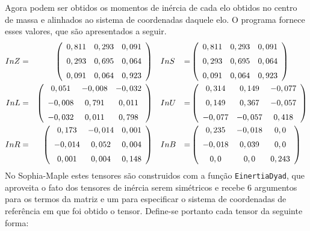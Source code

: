 Agora podem ser obtidos os momentos de inércia de cada elo obtidos no
centro de massa e alinhados ao sistema de coordenadas daquele elo. O programa
fornece esses valores, que são apresentados a seguir.
%
\begin{align*}
InZ &=& \left( \begin {array}{ccc}  0,811& 0,293& 0,091\\ \noalign{\medskip}
 0,293& 0,695& 0,064\\ \noalign{\medskip} 0,091& 0,064& 0,923
\end {array} \right) & \quad InS &=& \left( \begin {array}{ccc}  0,811& 0,293& 0,091\\ \noalign{\medskip}
 0,293& 0,695& 0,064\\ \noalign{\medskip} 0,091& 0,064& 0,923
\end {array} \right) \\
InL &=&  \left( \begin {array}{ccc}  0,051&-
0,008&- 0,032 \\ \noalign{\medskip}- 0,008& 0,791& 0,011\\ \noalign{\medskip}- 0,032
& 0,011& 0,798\end {array} \right) & \quad InU &=& \left( \begin {array}{ccc} 
0,314& 0,149&- 0,077\\ \noalign{\medskip} 0,149& 0,367&- 0,057\\ \noalign{\medskip}- 0,077&- 0,057& 0,418
\end {array} \right) \\
InR &=&  \left( \begin {array}{ccc}  0,173&-
0,014& 0,001\\ \noalign{\medskip} - 0,014& 0,052& 0,004\\ \noalign{\medskip} 0,001& 0,004& 0,148
\end {array} \right) & \quad InB &=&  \left( \begin {array}{ccc}  0,235&- 0,018& 0,0\\ \noalign{\medskip}-
 0,018& 0,039& 0,0\\ \noalign{\medskip} 0,0& 0,0& 0,243\end {array}
 \right)
\end{align*}
%
No Sophia-Maple estes tensores são construidos com a função
\texttt{EinertiaDyad}, que aproveita o fato dos tensores de inércia serem
simétricos e recebe 6 argumentos para os termos da matriz e um para especificar
o sistema de coordenadas de referência em que foi obtido o tensor. Define-se
portanto cada tensor da seguinte forma:

